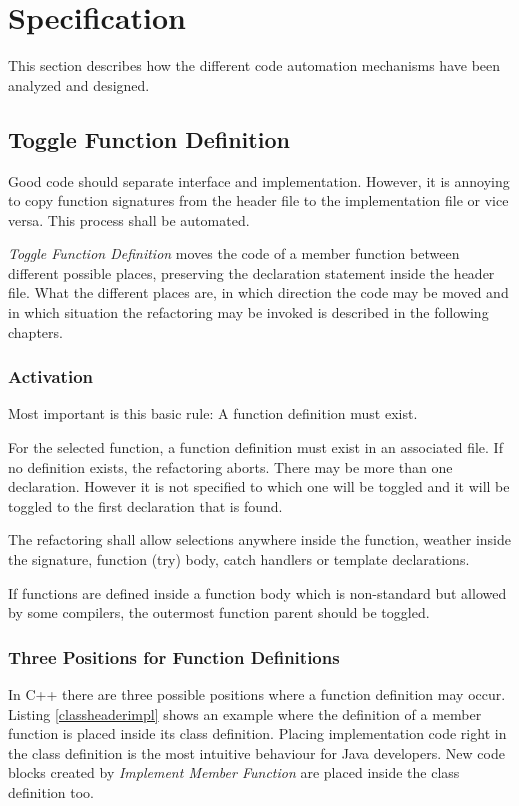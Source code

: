 \chapter{Specification}
\thispagestyle{fancy}

This section describes how the different code automation mechanisms have been
analyzed and designed.

\section{Toggle Function Definition}

Good code should separate interface and implementation. However, it is 
annoying to copy function signatures from the header file to the implementation 
file or vice versa. This process shall be automated.

\textit{Toggle Function Definition} moves the code of a member function between 
different possible places, preserving the declaration statement inside the 
header file. What the different places are, in which direction the code may be 
moved and in which situation the refactoring may be invoked is described in the 
following chapters.

\subsection{Activation}

Most important is this basic rule: A function definition must exist.

For the selected function, a function definition must exist in an
associated file. If no definition exists, the refactoring aborts. There may be
more than one declaration. However it is not specified to which one will be
toggled and it will be toggled to the first declaration that is found.

The refactoring shall allow selections anywhere inside the function, weather 
inside the signature, function (try) body, catch handlers or template 
declarations.

If functions are defined inside a function body which is non-standard but
allowed by some compilers, the outermost function parent should be toggled.
\cite{GCC}

\subsection{Three Positions for Function Definitions}

\label{positions}
In C++ there are three possible positions where a function definition may occur.
Listing \ref{classheaderimpl} shows an example where the definition of a member
function is placed inside its class definition. Placing implementation code
right in the class definition is the most intuitive behaviour for Java
developers. New code blocks created by \textit{Implement Member Function} are
placed inside the class definition too.

